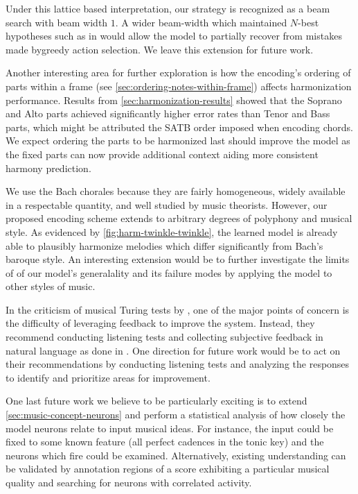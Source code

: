 Under this lattice based interpretation, our strategy is recognized as a beam
search with beam width $1$. A wider beam-width which maintained $N$-best
hypotheses such as in \citet{liu2014efficient} would allow the model to
partially recover from mistakes made bygreedy action selection. We leave this
extension for future work.


Another interesting area for further exploration is how the encoding's ordering
of parts within a frame (see \vref{sec:ordering-notes-within-frame}) affects
harmonization performance. Results from \vref{sec:harmonization-results} showed
that the Soprano and Alto parts achieved significantly higher error rates than
Tenor and Bass parts, which might be attributed the SATB order imposed when
encoding chords. We expect ordering the parts to be harmonized last should
improve the model as the fixed parts can now provide additional context aiding
more consistent harmony
prediction.

We use the Bach chorales because they are fairly homogeneous, widely available
in a respectable quantity, and well studied by music theorists. However, our
proposed encoding scheme extends to arbitrary degrees of polyphony and musical
style. As evidenced by \vref{fig:harm-twinkle-twinkle}, the learned model is
already able to plausibly harmonize melodies which differ significantly from
Bach's baroque style. An interesting extension would be to further investigate
the limits of of our model's generalality and its failure modes by applying
the model to other styles of music.

In the criticism of musical Turing tests by \citet{ariza2009interrogator}, one
of the major points of concern is the difficulty of leveraging feedback to
improve the system. Instead, they recommend conducting listening tests and
collecting subjective feedback in natural language as done in
\citet{collins2016developing}. One direction for future work would be to
act on their recommendations by conducting listening tests and analyzing
the responses to identify and prioritize areas for improvement.

One last future work we believe to be particularly exciting is to extend
\vref{sec:music-concept-neurons} and perform a statistical analysis of how
closely the model neurons relate to input musical ideas. For instance, the
input could be fixed to some known feature (\eg all perfect cadences in the
tonic key) and the neurons which fire could be examined. Alternatively,
existing understanding can be validated by annotation regions of a score
exhibiting a particular musical quality and searching for neurons with
correlated activity.
